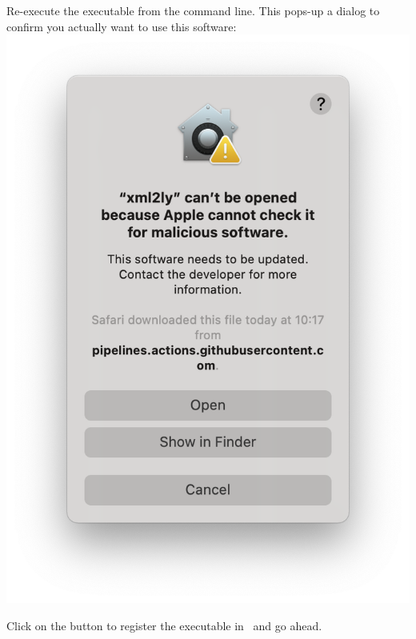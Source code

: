 Re-execute the executable from the command line. This pops-up a dialog to confirm you actually want to use this software:\\
\includegraphics[scale=0.35]{../graphics/MacOSConfirmOpening.png}

Click on the  button to register the executable in \Gatekeeper\ and go ahead.

